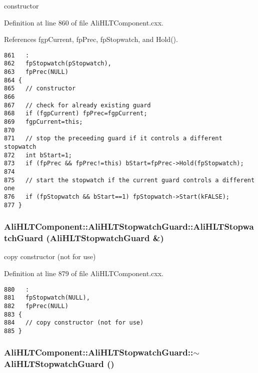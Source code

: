 constructor 

Definition at line 860 of file Ali\-HLTComponent.cxx.

References fgp\-Current, fp\-Prec, fp\-Stopwatch, and Hold().

\footnotesize\begin{verbatim}861   :
862   fpStopwatch(pStopwatch),
863   fpPrec(NULL)
864 {
865   // constructor
866 
867   // check for already existing guard
868   if (fgpCurrent) fpPrec=fgpCurrent;
869   fgpCurrent=this;
870 
871   // stop the preceeding guard if it controls a different stopwatch
872   int bStart=1;
873   if (fpPrec && fpPrec!=this) bStart=fpPrec->Hold(fpStopwatch);
874 
875   // start the stopwatch if the current guard controls a different one
876   if (fpStopwatch && bStart==1) fpStopwatch->Start(kFALSE);
877 }

\end{verbatim}\normalsize 


\subsubsection{\setlength{\rightskip}{0pt plus 5cm}Ali\-HLTComponent::Ali\-HLTStopwatch\-Guard::Ali\-HLTStopwatch\-Guard ({\bf Ali\-HLTStopwatch\-Guard} \&)}\label{classAliHLTComponent_1_1AliHLTStopwatchGuard_a2}


copy constructor (not for use) 

Definition at line 879 of file Ali\-HLTComponent.cxx.

\footnotesize\begin{verbatim}880   :
881   fpStopwatch(NULL),
882   fpPrec(NULL)
883 {
884   // copy constructor (not for use)
885 }

\end{verbatim}\normalsize 


\subsubsection{\setlength{\rightskip}{0pt plus 5cm}Ali\-HLTComponent::Ali\-HLTStopwatch\-Guard::$\sim${\bf Ali\-HLTStopwatch\-Guard} ()}\label{classAliHLTComponent_1_1AliHLTStopwatchGuard_a3}


